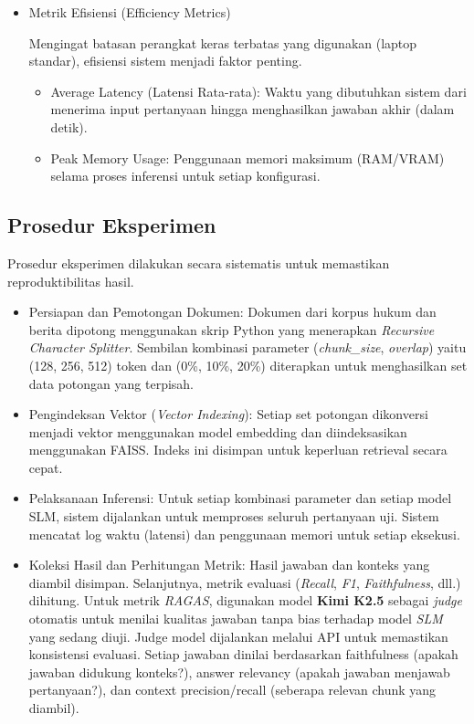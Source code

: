 \begin{itemize}
  \item Metrik Efisiensi (Efficiency Metrics)\par
    Mengingat batasan perangkat keras terbatas yang digunakan (laptop standar), efisiensi sistem menjadi faktor penting. 
    \begin{itemize}
     \item Average Latency (Latensi Rata-rata): Waktu yang dibutuhkan sistem dari menerima input pertanyaan hingga menghasilkan jawaban akhir (dalam detik).
     \item Peak Memory Usage: Penggunaan memori maksimum (RAM/VRAM) selama proses inferensi untuk setiap konfigurasi.
    \end{itemize}
\end{itemize}

\subsection{Prosedur Eksperimen}
Prosedur eksperimen dilakukan secara sistematis untuk memastikan reproduktibilitas hasil. 
\begin{itemize}
    \item Persiapan dan Pemotongan Dokumen: Dokumen dari korpus hukum dan berita dipotong menggunakan skrip Python yang menerapkan \textit{Recursive Character Splitter}. Sembilan kombinasi parameter (\textit{chunk\_size}, \textit{overlap}) yaitu (128, 256, 512) token dan (0\%, 10\%, 20\%) diterapkan untuk menghasilkan set data potongan yang terpisah. 
    \item Pengindeksan Vektor (\textit{Vector Indexing}): Setiap set potongan dikonversi menjadi vektor menggunakan model embedding dan diindeksasikan menggunakan FAISS. Indeks ini disimpan untuk keperluan retrieval secara cepat. 
    \item Pelaksanaan Inferensi: Untuk setiap kombinasi parameter dan setiap model SLM, sistem dijalankan untuk memproses seluruh pertanyaan uji. Sistem mencatat log waktu (latensi) dan penggunaan memori untuk setiap eksekusi. 
    \item Koleksi Hasil dan Perhitungan Metrik: Hasil jawaban dan konteks yang diambil disimpan. Selanjutnya, metrik evaluasi (\textit{Recall}, \textit{F1}, \textit{Faithfulness}, dll.) dihitung. Untuk metrik \textit{RAGAS}, digunakan model \textbf{Kimi K2.5} sebagai \textit{judge} otomatis untuk menilai kualitas jawaban tanpa bias terhadap model \textit{SLM} yang sedang diuji. Judge model dijalankan melalui API untuk memastikan konsistensi evaluasi. Setiap jawaban dinilai berdasarkan faithfulness (apakah jawaban didukung konteks?), answer relevancy (apakah jawaban menjawab pertanyaan?), dan context precision/recall (seberapa relevan chunk yang diambil).
\end{itemize}


